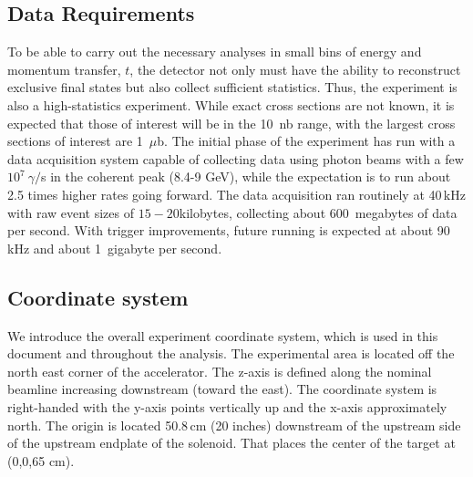 \subsection{Data Requirements \label{sec:intro:data_requirements}}
To be able to carry out the necessary analyses in small bins of energy and momentum transfer, $t$, the detector not only must have the ability to reconstruct exclusive final states but also collect sufficient statistics. Thus, the \GX{} experiment is also a high-statistics experiment. While exact cross sections are not known, it is expected that those of interest will be in the 10~nb range, with the largest cross sections of interest are 1~$\mu$b. The initial phase of the \GX{} experiment has run with a data acquisition system capable of collecting data using photon beams with a few $10^{7}~\gamma/$s in the coherent peak (8.4-9 GeV), while the expectation is to run about 2.5 times higher rates going forward. The data acquisition ran routinely at 40\,kHz with raw event sizes of $15-20$kilobytes, collecting about 600~megabytes of data per second. With trigger improvements, future running is expected at about 90 kHz and about 1~gigabyte per second.  

\subsection{Coordinate system \label{sec:intro:coordinates}}
We introduce the overall experiment coordinate system, which is used in this document and throughout the analysis. The experimental area is located 
off the north east corner of the accelerator. The z-axis is defined along the nominal beamline increasing downstream (toward the east). The coordinate system 
is right-handed with the y-axis points vertically up and the x-axis approximately north. 
The origin is located 50.8\,cm (20 inches) downstream of the upstream side of the upstream endplate of the solenoid. That places the center of the target at (0,0,65 cm).
